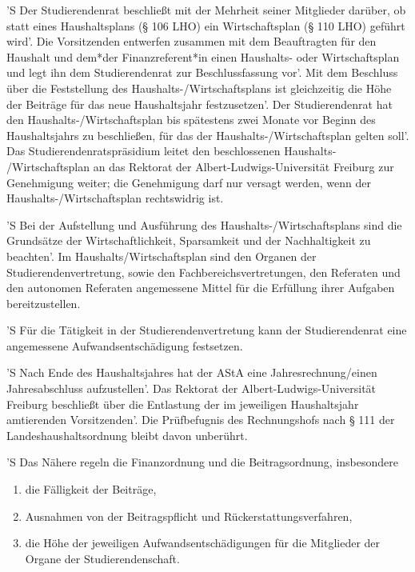 \documentclass[fontsize=12pt,parskip=half]{scrartcl}
\begin{document}
\begin{contract}
  'S Der Studierendenrat beschließt mit der Mehrheit seiner Mitglieder darüber, ob
  statt eines Haushaltsplans (§ 106 LHO) ein Wirtschaftsplan (§ 110 LHO)
  geführt wird'. Die Vorsitzenden entwerfen zusammen mit dem Beauftragten für den
  Haushalt und dem*der Finanzreferent*in einen Haushalts- oder Wirtschaftsplan
  und legt ihn dem Studierendenrat zur Beschlussfassung vor'. Mit dem Beschluss
  über die Feststellung des Haushalts-/Wirtschaftsplans ist gleichzeitig   die
  Höhe der Beiträge für das neue Haushaltsjahr festzusetzen'. Der Studierendenrat
  hat den Haushalts-/Wirtschaftsplan bis spätestens zwei Monate vor Beginn
  des Haushaltsjahrs zu beschließen, für das der Haushalts-/Wirtschaftsplan
  gelten soll'. Das Studierendenratspräsidium leitet den beschlossenen Haushalts-
  /Wirtschaftsplan an das Rektorat der Albert-Ludwigs-Universität Freiburg zur
  Genehmigung weiter; die Genehmigung darf nur versagt werden, wenn der
  Haushalts-/Wirtschaftsplan rechtswidrig ist.

  'S Bei der Aufstellung und Ausführung des Haushalts-/Wirtschaftsplans sind die
  Grundsätze der Wirtschaftlichkeit, Sparsamkeit und der Nachhaltigkeit zu
  beachten'. Im Haushalts/Wirtschaftsplan sind den Organen der
  Studierendenvertretung, sowie den Fachbereichsvertretungen, den Referaten und
  den autonomen Referaten angemessene Mittel für die Erfüllung ihrer Aufgaben
  bereitzustellen.

  'S Für die Tätigkeit in der Studierendenvertretung kann der Studierendenrat eine
  angemessene Aufwandsentschädigung festsetzen.

  'S Nach Ende des Haushaltsjahres hat der AStA eine Jahresrechnung/einen
  Jahresabschluss aufzustellen'. Das Rektorat der Albert-Ludwigs-Universität
  Freiburg beschließt über die Entlastung der im jeweiligen Haushaltsjahr
  amtierenden Vorsitzenden'. Die Prüfbefugnis des Rechnungshofs nach § 111 der
  Landeshaushaltsordnung bleibt davon unberührt.

  'S Das Nähere regeln die Finanzordnung und die Beitragsordnung, insbesondere
  \begin{enumerate}[\qquad 1.]
  \item die Fälligkeit der Beiträge,
  \item Ausnahmen von der Beitragspflicht und Rückerstattungsverfahren,
  \item die Höhe der jeweiligen Aufwandsentschädigungen für die Mitglieder der
    Organe der Studierendenschaft.
  \end{enumerate}

\end{contract}
\end{document}
